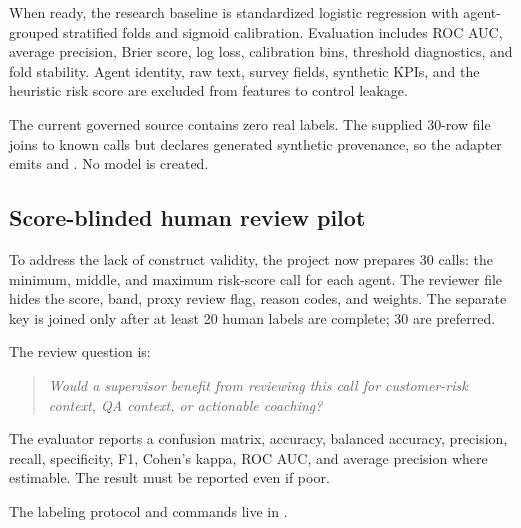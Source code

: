 \documentclass[11pt,letterpaper]{article}
\begin{document}
When ready, the research baseline is standardized logistic regression with
agent-grouped stratified folds and sigmoid calibration. Evaluation includes ROC AUC,
average precision, Brier score, log loss, calibration bins, threshold diagnostics, and
fold stability. Agent identity, raw text, survey fields, synthetic KPIs, and the
heuristic risk score are excluded from features to control leakage.

The current governed source contains zero real labels. The supplied 30-row file joins
to known calls but declares generated synthetic provenance, so the adapter emits
 and . No model is
created.

\subsection{Score-blinded human review pilot}

To address the lack of construct validity, the project now prepares 30 calls: the
minimum, middle, and maximum risk-score call for each agent. The reviewer file hides
the score, band, proxy review flag, reason codes, and weights. The separate key is
joined only after at least 20 human labels are complete; 30 are preferred.

The review question is:

\begin{quote}
\textit{Would a supervisor benefit from reviewing this call for customer-risk context,
QA context, or actionable coaching?}
\end{quote}

The evaluator reports a confusion matrix, accuracy, balanced accuracy, precision,
recall, specificity, F1, Cohen's kappa, ROC AUC, and average precision where estimable.
The result must be reported even if poor.


The labeling protocol and commands live in .
\end{document}
